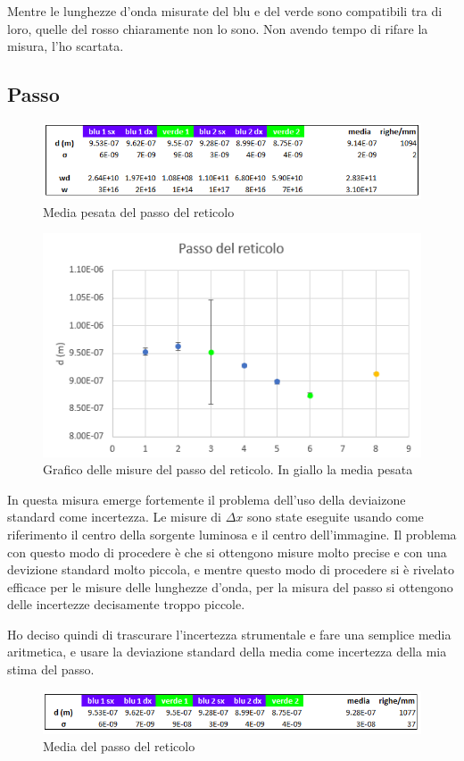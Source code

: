 \documentclass{article}
\begin{document}
Mentre le lunghezze d'onda misurate del blu e del verde sono compatibili tra di loro, quelle del rosso chiaramente non lo sono. Non avendo tempo di rifare la misura, l'ho scartata.

\clearpage

\subsection{Passo}

\begin{figure}[h!]
  \centering
  \includegraphics[width=0.6\linewidth]{IM_d}
  \caption{Media pesata del passo del reticolo}
\end{figure}

\begin{figure}[h!]
  \centering
  \includegraphics[width=0.6\linewidth]{IM grafico_d}
  \caption{Grafico delle misure del passo del reticolo. In giallo la media pesata}
\end{figure}

In questa misura emerge fortemente il problema dell'uso della deviaizone standard come incertezza. Le misure di $\Delta x$ sono state eseguite usando come riferimento il centro della sorgente luminosa e il centro dell'immagine. Il problema con questo modo di procedere è che si ottengono misure molto precise e con una devizione standard molto piccola, e mentre questo modo di procedere si è rivelato efficace per le misure delle lunghezze d'onda, per la misura del passo si ottengono delle incertezze decisamente troppo piccole.

Ho deciso quindi di trascurare l'incertezza strumentale e fare una semplice media aritmetica, e usare la deviazione standard della media come incertezza della mia stima del passo.

\begin{figure}[h!]
  \centering
  \includegraphics[width=0.6\linewidth]{IM_d_megl}
  \caption{Media del passo del reticolo}
\end{figure}
\end{document}
